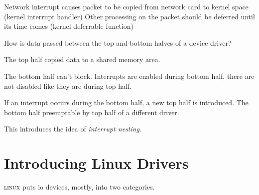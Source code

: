 \frmrule

\begin{example}
Network interrupt causes packet to be copied from 
network card to kernel space (kernel interrupt handler)
Other processing on the packet should be deferred until 
its time comes (kernel deferrable function)
\end{example}


\begin{example}
How is data passed between the top and bottom halves of a device driver?

The top half copied data to a shared memory area.
\end{example}

\frmrule

The bottom half can’t block. 
Interrupts are enabled during bottom half, 
there are not disabled like they are during top half.

If an interrupt occurs during the bottom half, 
a new top half is introduced. 
The bottom half preemptable by top half of a different driver.

This introduces the idea of \textit{interrupt nesting}.






\section{Introducing Linux Drivers}








\textsc{linux} puts io devices, mostly, into two categories.


\begin{figure}[h]
\end{figure}

